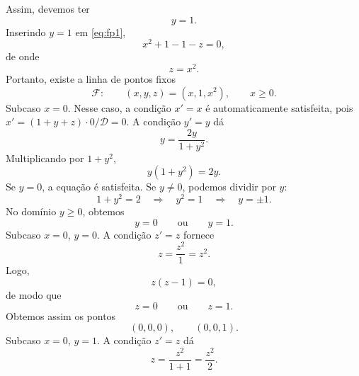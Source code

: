 \documentclass[12pt,a4paper]{article}
\begin{document}
Assim, devemos ter
%
\begin{equation}
    \boxed{y=1}.
    \label{eq:y1_p4}
\end{equation}
%
Inserindo \(y=1\) em \eqref{eq:fp1},
%
\begin{equation}
    x^2+1-1-z=0,
\end{equation}
%
de onde
%
\begin{equation}
    \boxed{z=x^2}.
    \label{eq:z_x2_p4}
\end{equation}
%
Portanto, existe a linha de pontos fixos
%
\begin{equation}
    \boxed{
    \mathcal F:
    \qquad
    (x,y,z)=(x,1,x^2),
    \qquad
    x\ge0.
    }
    \label{eq:fixed_line}
\end{equation}
%
Subcaso \(x=0\). Nesse caso, a condição \(x'=x\) é automaticamente satisfeita, pois
\(x'=(1+y+z)\cdot0/\mathcal D=0\). A condição \(y'=y\) dá
%
\begin{equation}
    y
    =
    \frac{2y}{1+y^2}.
\end{equation}
%
Multiplicando por \(1+y^2\),
%
\begin{equation}
    y(1+y^2)=2y.
\end{equation}
%
Se \(y=0\), a equação é satisfeita. Se \(y\neq0\), podemos dividir por
\(y\):
%
\begin{equation}
    1+y^2=2
    \quad\Longrightarrow\quad
    y^2=1
    \quad\Longrightarrow\quad
    y=\pm1.
\end{equation}
%
No domínio \(y\ge0\), obtemos
%
\begin{equation}
    y=0
    \qquad\text{ou}\qquad
    y=1.
\end{equation}
%
Subcaso \(x=0\), \(y=0\). A condição \(z'=z\) fornece
%
\begin{equation}
    z
    =
    \frac{z^2}{1}
    =
    z^2.
\end{equation}
%
Logo,
%
\begin{equation}
    z(z-1)=0,
\end{equation}
%
de modo que
%
\begin{equation}
    z=0
    \qquad\text{ou}\qquad
    z=1.
\end{equation}
%
Obtemos assim os pontos
%
\begin{equation}
    \boxed{
    (0,0,0),
    \qquad
    (0,0,1).
    }
\end{equation}
%
Subcaso \(x=0\), \(y=1\). A condição \(z'=z\) dá
%
\begin{equation}
    z
    =
    \frac{z^2}{1+1}
    =
    \frac{z^2}{2}.
\end{equation}
\end{document}

